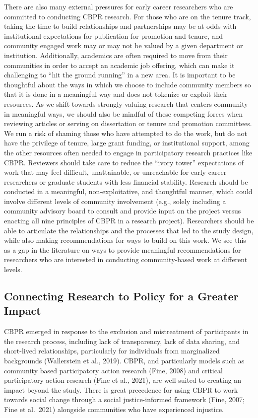 \documentclass[
  11pt,
]{book}
\begin{document}
There are also many external pressures for early career researchers who are committed to conducting CBPR research. For those who are on the tenure track, taking the time to build relationships and partnerships may be at odds with institutional expectations for publication for promotion and tenure, and community engaged work may or may not be valued by a given department or institution. Additionally, academics are often required to move from their communities in order to accept an academic job offering, which can make it challenging to ``hit the ground running'' in a new area. It is important to be thoughtful about the ways in which we choose to include community members so that it is done in a meaningful way and does not tokenize or exploit their resources. As we shift towards strongly valuing research that centers community in meaningful ways, we should also be mindful of these competing forces when reviewing articles or serving on dissertation or tenure and promotion committees. We run a risk of shaming those who have attempted to do the work, but do not have the privilege of tenure, large grant funding, or institutional support, among the other resources often needed to engage in participatory research practices like CBPR. Reviewers should take care to reduce the ``ivory tower'' expectations of work that may feel difficult, unattainable, or unreachable for early career researchers or graduate students with less financial stability. Research should be conducted in a meaningful, non-exploitative, and thoughtful manner, which could involve different levels of community involvement (e.g., solely including a community advisory board to consult and provide input on the project versus enacting all nine principles of CBPR in a research project). Researchers should be able to articulate the relationships and the processes that led to the study design, while also making recommendations for ways to build on this work. We see this as a gap in the literature on ways to provide meaningful recommendations for researchers who are interested in conducting community-based work at different levels.

\subsection{Connecting Research to Policy for a Greater Impact}\label{connecting-research-to-policy-for-a-greater-impact}

CBPR emerged in response to the exclusion and mistreatment of participants in the research process, including lack of transparency, lack of data sharing, and short-lived relationships, particularly for individuals from marginalized backgrounds (Wallerstein et al., 2019). CBPR, and particularly models such as community based participatory action research (Fine, 2008) and critical participatory action research (Fine et al., 2021), are well-suited to creating an impact beyond the study. There is great precedence for using CBPR to work towards social change through a social justice-informed framework (Fine, 2007; Fine et al.~2021) alongside communities who have experienced injustice.
\end{document}
